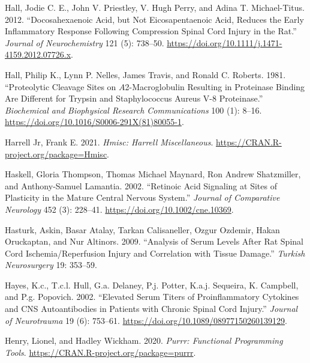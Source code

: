 \documentclass[9pt,lineno]{elife}
\newlength{\cslhangindent}
\newlength{\cslentryspacingunit} %
\newenvironment{CSLReferences}[2] %
 {%
  \setlength{\parindent}{0pt}
  \ifodd #1
  \let\oldpar\par
  \def\par{\hangindent=\cslhangindent\oldpar}
  \fi
  \setlength{\parskip}{#2\cslentryspacingunit}
 }%
 {}
\begin{document}
\begin{CSLReferences}{1}{0}
\leavevmode{}%
Hall, Jodie C. E., John V. Priestley, V. Hugh Perry, and Adina T. Michael-Titus. 2012. {``Docosahexaenoic Acid, but Not Eicosapentaenoic Acid, Reduces the Early Inflammatory Response Following Compression Spinal Cord Injury in the Rat.''} \emph{Journal of Neurochemistry} 121 (5): 738--50. \url{https://doi.org/10.1111/j.1471-4159.2012.07726.x}.

\leavevmode{}%
Hall, Philip K., Lynn P. Nelles, James Travis, and Ronald C. Roberts. 1981. {``Proteolytic Cleavage Sites on {\(A\)}2-Macroglobulin Resulting in Proteinase Binding Are Different for Trypsin and Staphylococcus Aureus {V-8} Proteinase.''} \emph{Biochemical and Biophysical Research Communications} 100 (1): 8--16. \url{https://doi.org/10.1016/S0006-291X(81)80055-1}.

\leavevmode{}%
Harrell Jr, Frank E. 2021. \emph{Hmisc: Harrell Miscellaneous}. \url{https://CRAN.R-project.org/package=Hmisc}.

\leavevmode{}%
Haskell, Gloria Thompson, Thomas Michael Maynard, Ron Andrew Shatzmiller, and Anthony-Samuel Lamantia. 2002. {``Retinoic Acid Signaling at Sites of Plasticity in the Mature Central Nervous System.''} \emph{Journal of Comparative Neurology} 452 (3): 228--41. \url{https://doi.org/10.1002/cne.10369}.

\leavevmode{}%
Hasturk, Askin, Basar Atalay, Tarkan Calisaneller, Ozgur Ozdemir, Hakan Oruckaptan, and Nur Altinors. 2009. {``Analysis of {Serum Levels} After {Rat Spinal Cord Ischemia}/{Reperfusion Injury} and {Correlation} with {Tissue Damage}.''} \emph{Turkish Neurosurgery} 19: 353--59.

\leavevmode{}%
Hayes, K.c., T.c.l. Hull, G.a. Delaney, P.j. Potter, K.a.j. Sequeira, K. Campbell, and P.g. Popovich. 2002. {``Elevated {Serum Titers} of {Proinflammatory Cytokines} and {CNS Autoantibodies} in {Patients} with {Chronic Spinal Cord Injury}.''} \emph{Journal of Neurotrauma} 19 (6): 753--61. \url{https://doi.org/10.1089/08977150260139129}.

\leavevmode{}%
Henry, Lionel, and Hadley Wickham. 2020. \emph{Purrr: Functional Programming Tools}. \url{https://CRAN.R-project.org/package=purrr}.


\end{CSLReferences}
\end{document}
